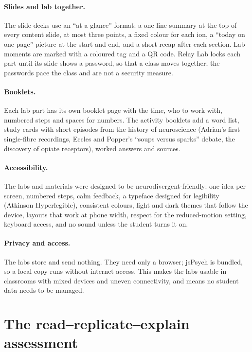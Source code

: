\documentclass[11pt,a4paper]{article}
\begin{document}
\paragraph{Slides and lab together.} The slide decks use an ``at a glance'' format: a one-line summary at the top of every content slide, at most three points, a fixed colour for each ion, a ``today on one page'' picture at the start and end, and a short recap after each section. Lab moments are marked with a coloured tag and a QR code. Relay Lab locks each part until its slide shows a password, so that a class moves together; the passwords pace the class and are not a security measure.

\paragraph{Booklets.} Each lab part has its own booklet page with the time, who to work with, numbered steps and spaces for numbers. The activity booklets add a word list, study cards with short episodes from the history of neuroscience (Adrian's first single-fibre recordings, Eccles and Popper's ``soups versus sparks'' debate, the discovery of opiate receptors), worked answers and sources.

\paragraph{Accessibility.} The labs and materials were designed to be neurodivergent-friendly: one idea per screen, numbered steps, calm feedback, a typeface designed for legibility (Atkinson Hyperlegible), consistent colours, light and dark themes that follow the device, layouts that work at phone width, respect for the reduced-motion setting, keyboard access, and no sound unless the student turns it on.

\paragraph{Privacy and access.} The labs store and send nothing. They need only a browser; jsPsych is bundled, so a local copy runs without internet access. This makes the labs usable in classrooms with mixed devices and uneven connectivity, and means no student data needs to be managed.

\section{The read--replicate--explain assessment}
\end{document}
